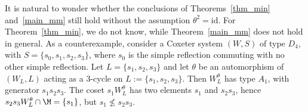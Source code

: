 \begin{rema}
	It is natural to wonder whether the conclusions of Theorems~\ref{thm_min} and~\ref{main_mm} still hold without the assumption $\theta^2=\mathrm{id}$. For Theorem~\ref{thm_min}, we do not know, while Theorem~\ref{main_mm} does not hold in general. As a counterexample, consider a Coxeter system $(W,S)$ of type $D_4$, with $S=\{s_0, s_1, s_2, s_3\}$, where $s_0$ is the simple reflection commuting with no other simple reflection. Let $L=\{s_1, s_2, s_3\}$ and let $\theta$ be an automorphism of $(W_L, L)$ acting as a $3$-cycle on $L:=\{s_1, s_2, s_3\}$. Then $W_L^\theta$ has type $A_1$, with generator $s_1 s_2 s_3$. The coset $s_1 W_L^\theta$ has two elements $s_1$ and $s_2 s_3$, hence $s_2 s_3 W_L^\theta \cap \M=\{s_1\}$, but $s_1 \not\leq s_2 s_3$. 
\end{rema}

